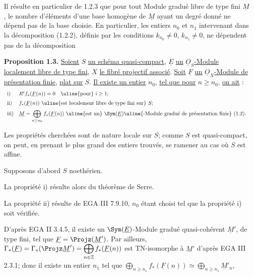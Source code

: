 
Il
résulte en particulier de 1.2.3 que pour tout Module gradué libre de type fini \(\underline{M}\), le nombre d'éléments d'une base homogène de \(\underline{M}\) ayant un degré donné ne dépend pas de la base choisie. En particulier, les entiers \(n_0\) et \(n_1\) intervenant dans la décomposition (1.2.2), définis par les conditions \(k_{n_0}\neq0\), \(k_{n_1}\neq0\), ne dépendent pas de la décomposition

\textbf{Proposition 1.3.} \uline{Soient} \(S\) \uline{un schéma quasi-compact}, \(\underline{E}\) \uline{un} \(\underline{O}_S\)\uline{-Module localement libre de type fini}, \(X\) \uline{le fibré projectif associé}. \uline{Soit} \(\underline{F}\) \uline{un} \(\underline{O}_X\)\uline{-Module de présentation finie}, \uline{plat sur} \(S\). \uline{Il existe un entier} \(n_0\), \uline{tel que pour} \(n\geq n_0\), \uline{on ait} :
\[
\begin{array}{ll}
\text{i)}& R^i f_*(\underline{F}(n))=0\quad\text{\uline{pour} }i\geq 1;\\[2mm]
\text{ii)}& f_*(\underline{F}(n))\text{ \uline{est localement libre de type fini sur} }S;\\[2mm]
\text{iii)}& \underline{M}=\displaystyle\bigoplus_{n\geq n_0} f_*(\underline{F}(n))\text{ \uline{est un} }\Sym(\underline{E})\text{\uline{-Module gradué de présentation finie} (1.2).}
\end{array}
\]

Les propriétés cherchées sont de nature locale sur \(S\); comme \(S\) est quasi-compact, on peut, en prenant le plus grand des entiers trouvés, se ramener au cas où \(S\) est affine.

Supposons d'abord \(S\) noethérien.

La propriété i) résulte alors du théorème de Serre.

La propriété ii) résulte de EGA III 7.9.10, \(n_0\) étant choisi tel que la propriété i) soit vérifiée.

D'après EGA II 3.4.5, il existe un \(\Sym(\underline{E})\)-Module gradué quasi-cohérent \(\underline{M}'\), de type fini, tel que \(\underline{F}=\Projz(\underline{M}')\). Par ailleurs, \(\Gamma_*(\underline{F})=\Gamma_*(\Projz \underline{M}')=\displaystyle\bigoplus_{n\in\mathbb Z} f_*(\underline{F}(n))\) est TN-isomorphe à \(\underline{M}'\) d'après EGA III 2.3.1; donc il existe un entier \(n_1\) tel que \(\displaystyle\bigoplus_{n\geq n_1} f_*(\underline{F}(n))\simeq \bigoplus_{n\geq n_1} \underline{M}'_n\),
